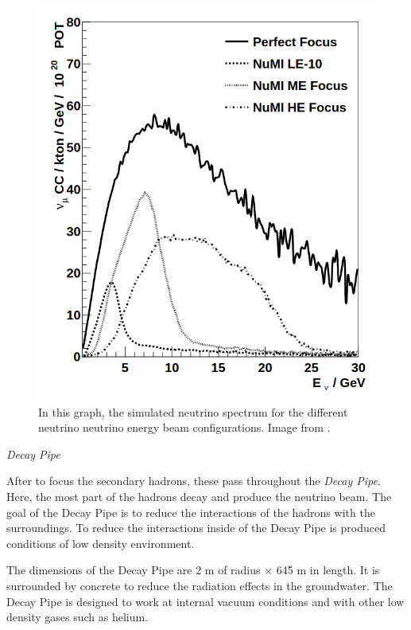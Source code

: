 \begin{figure}[!htb]
\centering
\includegraphics[scale=0.3]{Figures/Chapter2/nuAllSpectrums.png}
        \caption{In this graph, the simulated neutrino spectrum for the different neutrino neutrino energy beam configurations. Image from \cite{Numi}.} 
\label{fig:MnvExp:NuMI:NuMIFocusingComponents}
\end{figure}

\textit{Decay Pipe}

After to focus the secondary hadrons, these pass throughout the \textit{Decay Pipe}. Here, the most part of the hadrons decay and produce the neutrino beam. The goal of the Decay Pipe is to reduce the interactions of the hadrons with the surroundings. To reduce the interactions inside of the Decay Pipe is produced conditions of low density environment. 

The dimensions of the Decay Pipe are 2 m of radius $\times$ 645 m in length. It is surrounded by concrete to reduce the radiation effects in the groundwater. The Decay Pipe is designed to work at internal vacuum conditions and with other low density gases such as helium. 

